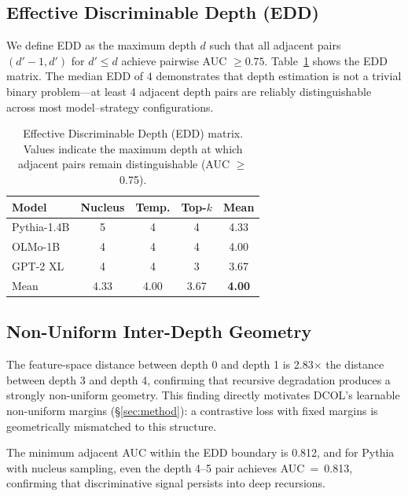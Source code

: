 \documentclass[11pt,a4paper]{article}
\newcommand{\ours}{DCOL}
\begin{document}
\subsection{Effective Discriminable Depth (EDD)}
\label{sec:edd}

We define EDD as the maximum depth $d$ such that all adjacent pairs $(d'{-}1, d')$ for $d' \le d$ achieve pairwise AUC $\ge 0.75$.
Table~\ref{tab:edd} shows the EDD matrix.
The median EDD of 4 demonstrates that depth estimation is not a trivial binary problem---at least 4 adjacent depth pairs are reliably distinguishable across most model--strategy configurations.

\begin{table}[t]
\centering
\small
\begin{tabular}{lcccc}
\toprule
\textbf{Model} & \textbf{Nucleus} & \textbf{Temp.} & \textbf{Top-$k$} & \textbf{Mean} \\
\midrule
Pythia-1.4B & 5 & 4 & 4 & 4.33 \\
OLMo-1B    & 4 & 4 & 4 & 4.00 \\
GPT-2 XL   & 4 & 4 & 3 & 3.67 \\
\midrule
Mean        & 4.33 & 4.00 & 3.67 & \textbf{4.00} \\
\bottomrule
\end{tabular}
\caption{Effective Discriminable Depth (EDD) matrix. Values indicate the maximum depth at which adjacent pairs remain distinguishable (AUC $\ge$ 0.75).}
\label{tab:edd}
\end{table}

\subsection{Non-Uniform Inter-Depth Geometry}
\label{sec:geometry}

The feature-space distance between depth 0 and depth 1 is 2.83$\times$ the distance between depth 3 and depth 4, confirming that recursive degradation produces a strongly non-uniform geometry.
This finding directly motivates \ours{}'s learnable non-uniform margins (\S\ref{sec:method}): a contrastive loss with fixed margins is geometrically mismatched to this structure.

The minimum adjacent AUC within the EDD boundary is 0.812, and for Pythia with nucleus sampling, even the depth 4--5 pair achieves AUC~=~0.813, confirming that discriminative signal persists into deep recursions.

\end{document}

